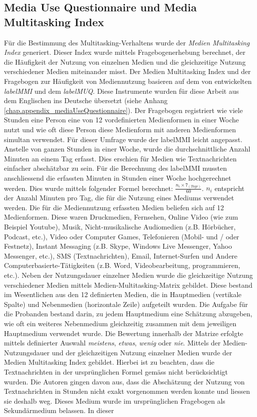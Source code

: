 \subsection{Media Use Questionnaire und Media Multitasking Index}\label{subsection.muq}
Für die Bestimmung des Multitasking-Verhaltens wurde der \textit{Medien Multitasking Index} generiert. Dieser Index wurde mittels Fragebogenerhebung berechnet, der die Häufigkeit der Nutzung von einzelnen Medien und die gleichzeitige Nutzung verschiedener Medien miteinander misst. Der Medien Multitasking Index und der Fragebogen zur Häufigkeit von Mediennutzung basieren auf dem von  entwickelten \textit{\gls{labelMMI}} und dem \textit{\gls{labelMUQ}}. Diese Instrumente wurden für diese Arbeit aus dem Englischen ins Deutsche übersetzt (siehe Anhang \ref{chap.appendix_mediaUseQuestionnaire}). Der Fragebogen registriert wie viele Stunden eine Person eine von 12 vordefinierten Medienformen in einer Woche nutzt und wie oft diese Person diese Medienform mit anderen Medienformen simultan verwendet. Für dieser Umfrage wurde der \gls{labelMMI} leicht angepasst. Anstelle von ganzen Stunden in einer Woche, wurde die durchschnittliche Anzahl Minuten an einem Tag erfasst. Dies erschien für Medien wie Textnachrichten einfacher abschätzbar zu sein. Für die Berechnung des \gls{labelMMI} mussten anschliessend die erfassten Minuten in Stunden einer Woche hochgerechnet werden. Dies wurde mittels folgender Formel berechnet: \(\frac{n_{i} \times 7_{(Tage)}}{60}\). \(n_{i}\) entspricht der Anzahl Minuten pro Tag, die für die Nutzung eines Mediums verwendet werden. Die für die Mediennutzung erfassten Medien beliefen sich auf 12 Medienformen. Diese waren Druckmedien, Fernsehen, Online Video (wie zum Beispiel Youtube), Musik, Nicht-musikalische Audiomedien (z.B. Hörbücher, Podcast, etc.), Video oder Computer Games, Telefonieren (Mobil- und / oder Festnetz), Instant Messaging (z.B. Skype, Windows Live Messenger, Yahoo Messenger, etc.), SMS (Textnachrichten), Email, Internet-Surfen und Andere Computerbasierte-Tätigkeiten (z.B. Word, Videobearbeitung, programmieren, etc.). Neben der Nutzungsdauer einzelner Medien wurde die gleichzeitige Nutzung verschiedener Medien mittels Medien-Multitasking-Matrix gebildet. Diese bestand im Wesentlichen aus den 12 definierten Medien, die in Hauptmedien (vertikale Spalte) und Nebenmedien (horizontale Zeile) aufgeteilt wurden. Die Aufgabe für die Probanden bestand darin, zu jedem Hauptmedium eine Schätzung abzugeben, wie oft ein weiteres Nebenmedium gleichzeitig zusammen mit dem jeweiligen Hauptmedium verwendet wurde. Die Bewertung innerhalb der Matrize erfolgte mittels definierter Auswahl \textit{meistens}, \textit{etwas}, \textit{wenig} oder \textit{nie}. Mittels der Medien-Nutzungsdauer und der gleichzeitigen Nutzung einzelner Medien wurde der Medien Multitasking Index gebildet. Hierbei ist zu beachten, dass die Textnachrichten in der ursprünglichen Formel gemäss \cite{Ophir2009}  nicht berücksichtigt wurden. Die Autoren gingen davon aus, dass die Abschätzung der Nutzung von Textnachrichten in Stunden nicht exakt vorgenommen werden konnte und liessen sie deshalb weg. Dieses Medium wurde im ursprünglichen Fragebogen als Sekundärmedium belassen. In dieser 